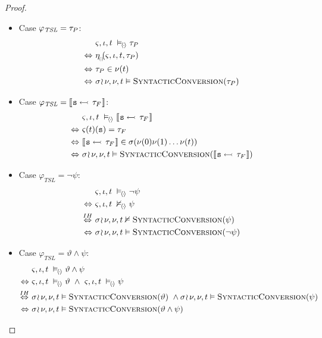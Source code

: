 \begin{proof}
\begin{itemize}
  \item Case $ \varphi_{\textit{TSL}} = \tau_{P} $:
    \begin{align*}
      & \varsigma, \iota, t \;\vDash_{\!\langle \hspace{-1pt} \cdot \hspace{-1pt} \rangle} \tau_{P} \\ \Leftrightarrow~ &
      \eta_{_{\!\langle \hspace{-1pt} \cdot \hspace{-1pt} \rangle\!}}\!(\varsigma, \iota, t, \tau_{P}) \\ \Leftrightarrow~ &
      \tau_{P} \in \nu(t) \\ \Leftrightarrow~ &
      \sigma \! \wr \hspace{-0.6pt} \nu, \nu, t \vDash \textsc{SyntacticConversion}(\tau_{P})
    \end{align*}

  \item Case $ \varphi_{\textit{TSL}} = \llbracket \hspace{0.5pt} {\text{\texttt{s}}} \leftarrowtail \, \tau_{F} \hspace{0.5pt} \rrbracket $:
    \begin{align*}
      & \varsigma, \iota, t \;\vDash_{\!\langle \hspace{-1pt} \cdot \hspace{-1pt} \rangle} \llbracket \hspace{0.5pt} {\text{\texttt{s}}} \leftarrowtail \, \tau_{F} \hspace{0.5pt} \rrbracket \\ \Leftrightarrow~&
      \varsigma(t)({\text{\texttt{s}}}) = \tau_{F} \\ \Leftrightarrow~&
      \llbracket \hspace{0.5pt} {\text{\texttt{s}}} \leftarrowtail \, \tau_{F} \hspace{0.5pt} \rrbracket \in \sigma(\nu(0) \nu(1) \ldots \nu(t)) \\ \Leftrightarrow~&
      \sigma \! \wr \hspace{-0.6pt} \nu, \nu, t \vDash \textsc{SyntacticConversion}(\llbracket \hspace{0.5pt} {\text{\texttt{s}}} \leftarrowtail \, \tau_{F} \hspace{0.5pt} \rrbracket)
    \end{align*}

  \item Case $ \varphi_{\textit{TSL}} = \neg \psi $:
    \begin{align*}
      & \varsigma, \iota, t \;\vDash_{\!\langle \hspace{-1pt} \cdot \hspace{-1pt} \rangle} \neg \psi \\ \Leftrightarrow~ &
      \varsigma, \iota, t \;\nvDash_{\!\langle \hspace{-1pt} \cdot \hspace{-1pt} \rangle} \psi \\ \overset{IH}{\Leftrightarrow}~ &
      \sigma \! \wr \hspace{-0.6pt} \nu, \nu, t \nvDash \textsc{SyntacticConversion}(\psi) \\ \Leftrightarrow~&
      \sigma \! \wr \hspace{-0.6pt} \nu, \nu, t \vDash \textsc{SyntacticConversion}(\neg \psi)
    \end{align*}

  \item Case $ \varphi_{\textit{TSL}} = \vartheta \wedge \psi $:
    \begin{align*}
      & \comp, \iota, t \sats \vartheta \wedge \psi \\ \Leftrightarrow~ &
      \comp, \iota, t \sats \vartheta \ \wedge \ \comp, \iota, t \sats \psi \\ \overset{IH}{\Leftrightarrow}~ &
      \branch{\sigma}{\nu}, \nu, t \vDash \textsc{SyntacticConversion}(\vartheta) \ \wedge \branch{\sigma}{\nu}, \nu, t \vDash \textsc{SyntacticConversion}(\psi) \\ \Leftrightarrow~&
      \branch{\sigma}{\nu}, \nu, t \vDash \textsc{SyntacticConversion}(\vartheta \wedge \psi)
    \end{align*}


\end{itemize}
\end{proof}
